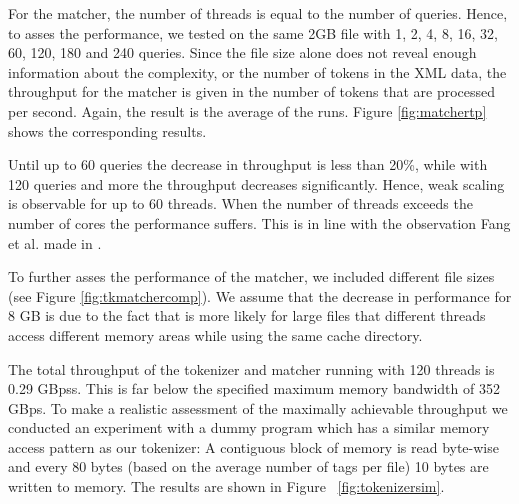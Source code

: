 For the matcher, the number of threads is equal to the number of queries. Hence,
to asses the performance, we tested on the same 2GB file with 1, 2, 4, 8, 16,
32, 60, 120, 180 and 240 queries. Since the file size alone does not reveal
enough information about the complexity, or the number of tokens in the XML
data, the throughput for the matcher is given in the number of tokens that are
processed per second. Again, the result is the average of the runs.  Figure
\ref{fig:matchertp} shows the corresponding results.

Until up to 60 queries the decrease in throughput is less than 20\%, while with
120 queries and more the throughput decreases significantly. Hence, weak scaling
is observable for up to 60 threads. When the number of threads exceeds the
number of cores the performance suffers. This is in line with the observation
Fang et al. made in \cite{Fang14}.

To further asses the performance of the matcher, we included different file
sizes (see Figure \ref{fig:tkmatchercomp}). We assume that the decrease in
performance for 8 GB is due to the fact that is more likely for large files that
different threads access different memory areas while using the same cache
directory.

The total throughput of the tokenizer and matcher running with 120 threads is
0.29 GBpss. This is far below the specified maximum memory bandwidth of 352
GBps. To make a realistic assessment of the maximally achievable throughput
we conducted an experiment with a dummy program which has a similar memory
access pattern as our tokenizer: A contiguous block of memory is read byte-wise
and every 80 bytes (based on the average number of tags per file) 10 bytes are
written to memory. The results are shown in Figure ~\ref{fig:tokenizersim}.
